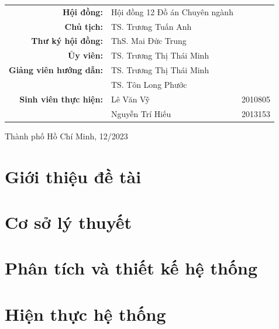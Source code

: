 \documentclass[a4paper]{article}
\begin{document}
\begin{titlepage}
	\begin{table}[H]
		\centering
		\begin{tabular}{rll}
			\textbf{Hội đồng:}              & Hội đồng 12 Đồ án Chuyên ngành 	&         \\
			\textbf{Chủ tịch:}              & TS. Trương Tuấn Anh            	&         \\
			\textbf{Thư ký hội đồng:}       & ThS. Mai Đức Trung             	&         \\
			\textbf{Ủy viên:}               & TS. Trương Thị Thái Minh       	&         \\
			\textbf{Giảng viên hướng dẫn:} & TS. Trương Thị Thái Minh			&         \\
			                               & TS. Tôn Long Phước             	&         \\
			\textbf{Sinh viên thực hiện:}  & Lê Văn Vỹ                      	& 2010805 \\
			                               & Nguyễn Trí Hiếu                	& 2013153 \\
		\end{tabular}
	\end{table}

	\vspace{5cm}
	\begin{center}
		{\footnotesize Thành phố Hồ Chí Minh, 12/2023}
	\end{center}
\end{titlepage}
\vspace{20cm}

\pagebreak
\tableofcontents
\pagebreak
{}
\pagebreak
\makeatletter
\makeatother
\listoffigures
\pagebreak
\listoftables
\pagebreak
\printnoidxglossary[type=\acronymtype,title=Danh sách từ ngữ viết tắt]
\pagebreak


\section{Giới thiệu đề tài}

\newpage
\section{Cơ sở lý thuyết}

\newpage
\section{Phân tích và thiết kế hệ thống}

\newpage
\section{Hiện thực hệ thống}

\newpage
% 

\newpage

\end{document}
